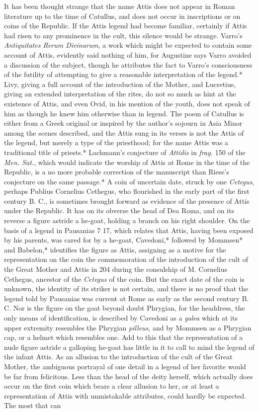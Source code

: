 \documentclass[a4paper, 11pt, oneside, polutonikogreek, english]{article}
\begin{document}
It has been thought strange that the name Attis does not appear in Roman literature up to the time of Catullus, and does not occur in inscriptions or on coins of the Republic. If the Attis legend had become familiar, certainly if Attis had risen to any prominence in the cult, this silence would be strange. Varro's \emph{Antiquitates Rerum Divinarum}, a work which might be expected to contain some account of Attis, evidently said nothing of him, for Augustine says Varro avoided a discussion of the subject, though he attributes the fact to Varro's consciousness of the futility of attempting to give a reasonable interpretation of the legend.* Livy, giving a full account of the introduction of the Mother, and Lucretius, giving an extended interpretation of the rites, do not so much as hint at the existence of Attis, and even Ovid, in his mention of the youth, does not speak of him as though he knew him otherwise than in legend. The poem of Catullus is either from a Greek original or inspired by the author's sojourn in Asia Minor among the scenes described, and the Attis sung in its verses is not the Attis of the legend, but merely a type of the priesthood; for the name Attis was a traditional title of priests.* Lachmann's conjecture of \emph{Attidis} in \emph{frag.} 150 of the \emph{Men. Sat.}, which would indicate the worship of Attis at Rome in the time of the Republic, is a no more probable correction of the manuscript than Riese's conjecture on the same passage.* A coin of uncertain date, struck by one \emph{Cetegus}, perhaps Publius Cornelius Cethegus, who flourished in the early part of the first century B. C., is sometimes brought forward as evidence of the presence of Attis under the Republic. It has on its obverse the head of Dea Roma, and on its reverse a figure astride a he-goat, holding a branch on his right shoulder. On the basis of a legend in Pausanias 7 17, which relates that Attis, having been exposed by his parents, was cared for by a he-goat, Cavedoni,* followed by Mommsen* and Babelon,* identifies the figure as Attis, assigning as a motive for the representation on the coin the commemoration of the introduction of the cult of the Great Mother and Attis in 204 during the consulship of M. Cornelius Cethegus, ancestor of the \emph{Cetegus} of the coin. But the exact date of the coin is unknown, the identity of its striker is not certain, and there is no proof that the legend told by Pausanias was current at Rome as early as the second century B. C. Nor is the figure on the goat beyond doubt Phrygian, for the headdress, the only means of identification, is described by Cavedoni as a \emph{galea} which at its upper extremity resembles the Phrygian \emph{pilleus}, and by Mommsen as a Phrygian cap, or a helmet which resembles one. Add to this that the representation of a nude figure astride a galloping he-goat has little in it to call to mind the legend of the infant Attis. As an allusion to the introduction of the cult of the Great Mother, the ambiguous portrayal of one detail in a legend of her favorite would be far from felicitous. Less than the head of the deity herself, which actually does occur on the first coin which bears a clear allusion to her, or at least a representation of Attis with unmistakable attributes, could hardly be expected. The most that can 
\end{document}
